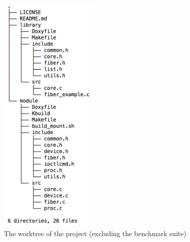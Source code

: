 \documentclass[a4paper,10pt]{article}
\begin{document}
\begin{figure}[htb!]
  \centering
    \centering
    \includegraphics[height=12cm]{imgs/tree}
    \caption{The worktree of the project (excluding the benchmark suite)}
    \label{fig:2figsA}
\end{figure}
\end{document}
